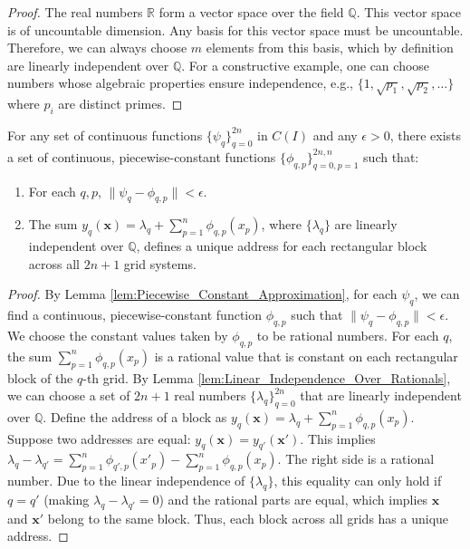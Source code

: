 \begin{proof}
    The real numbers $\mathbb{R}$ form a vector space over the field $\mathbb{Q}$. This vector space is of uncountable dimension. Any basis for this vector space must be uncountable. Therefore, we can always choose $m$ elements from this basis, which by definition are linearly independent over $\mathbb{Q}$. For a constructive example, one can choose numbers whose algebraic properties ensure independence, e.g., $\{1, \sqrt{p_1}, \sqrt{p_2}, \dots\}$ where $p_i$ are distinct primes.
\end{proof}

\begin{lemma}
    \label{lem:Addressable_Grids}
    For any set of continuous functions $\{\psi_q\}_{q=0}^{2n}$ in $C(I)$ and any $\epsilon > 0$, there exists a set of continuous, piecewise-constant functions $\{\phi_{q,p}\}_{q=0, p=1}^{2n, n}$ such that:
    \begin{enumerate}
        \item For each $q, p$, $\|\psi_q - \phi_{q,p}\| < \epsilon$.
        \item The sum $y_q(\mathbf{x}) = \lambda_q + \sum_{p=1}^n \phi_{q,p}(x_p)$, where $\{\lambda_q\}$ are linearly independent over $\mathbb{Q}$, defines a unique address for each rectangular block across all $2n+1$ grid systems.
    \end{enumerate}
\end{lemma}

\begin{proof}
    By Lemma \ref{lem:Piecewise_Constant_Approximation}, for each $\psi_q$, we can find a continuous, piecewise-constant function $\phi_{q,p}$ such that $\|\psi_q - \phi_{q,p}\| < \epsilon$. We choose the constant values taken by $\phi_{q,p}$ to be rational numbers.
    For each $q$, the sum $\sum_{p=1}^n \phi_{q,p}(x_p)$ is a rational value that is constant on each rectangular block of the $q$-th grid. By Lemma \ref{lem:Linear_Independence_Over_Rationals}, we can choose a set of $2n+1$ real numbers $\{\lambda_q\}_{q=0}^{2n}$ that are linearly independent over $\mathbb{Q}$.
    Define the address of a block as $y_q(\mathbf{x}) = \lambda_q + \sum_{p=1}^n \phi_{q,p}(x_p)$. Suppose two addresses are equal: $y_q(\mathbf{x}) = y_{q'}(\mathbf{x'})$. This implies $\lambda_q - \lambda_{q'} = \sum_{p=1}^n \phi_{q',p}(x'_p) - \sum_{p=1}^n \phi_{q,p}(x_p)$. The right side is a rational number. Due to the linear independence of $\{\lambda_q\}$, this equality can only hold if $q=q'$ (making $\lambda_q - \lambda_{q'} = 0$) and the rational parts are equal, which implies $\mathbf{x}$ and $\mathbf{x'}$ belong to the same block. Thus, each block across all grids has a unique address.
\end{proof}

